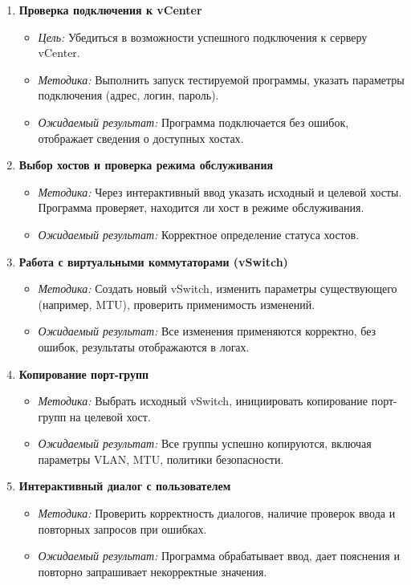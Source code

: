 \begin{enumerate}
    \item \textbf{Проверка подключения к vCenter}
    \begin{itemize}
        \item \textit{Цель:} Убедиться в возможности успешного подключения к серверу vCenter.
        \item \textit{Методика:} Выполнить запуск тестируемой программы, указать параметры подключения (адрес, логин, пароль).
        \item \textit{Ожидаемый результат:} Программа подключается без ошибок, отображает сведения о доступных хостах.
    \end{itemize}

    \item \textbf{Выбор хостов и проверка режима обслуживания}
    \begin{itemize}
        \item \textit{Методика:} Через интерактивный ввод указать исходный и целевой хосты. Программа проверяет, находится ли хост в режиме обслуживания.
        \item \textit{Ожидаемый результат:} Корректное определение статуса хостов.
    \end{itemize}

    \item \textbf{Работа с виртуальными коммутаторами (vSwitch)}
    \begin{itemize}
        \item \textit{Методика:} Создать новый vSwitch, изменить параметры существующего (например, MTU), проверить применимость изменений.
        \item \textit{Ожидаемый результат:} Все изменения применяются корректно, без ошибок, результаты отображаются в логах.
    \end{itemize}

    \item \textbf{Копирование порт-групп}
    \begin{itemize}
        \item \textit{Методика:} Выбрать исходный vSwitch, инициировать копирование порт-групп на целевой хост.
        \item \textit{Ожидаемый результат:} Все группы успешно копируются, включая параметры VLAN, MTU, политики безопасности.
    \end{itemize}

    \item \textbf{Интерактивный диалог с пользователем}
    \begin{itemize}
        \item \textit{Методика:} Проверить корректность диалогов, наличие проверок ввода и повторных запросов при ошибках.
        \item \textit{Ожидаемый результат:} Программа обрабатывает ввод, дает пояснения и повторно запрашивает некорректные значения.
    \end{itemize}
\end{enumerate}

